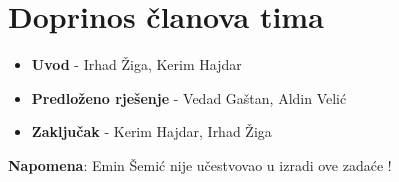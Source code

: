 \documentclass{article}
\begin{document}
\section{Doprinos članova tima}
\begin{itemize}
    \item \textbf{Uvod} - Irhad Žiga, Kerim Hajdar
    \item \textbf{Predloženo rješenje} - Vedad Gaštan, Aldin Velić
    \item \textbf{Zaključak} - Kerim Hajdar, Irhad Žiga
\end{itemize}
\textbf{Napomena}: Emin Šemić nije učestvovao u izradi ove zadaće !
\end{document}

